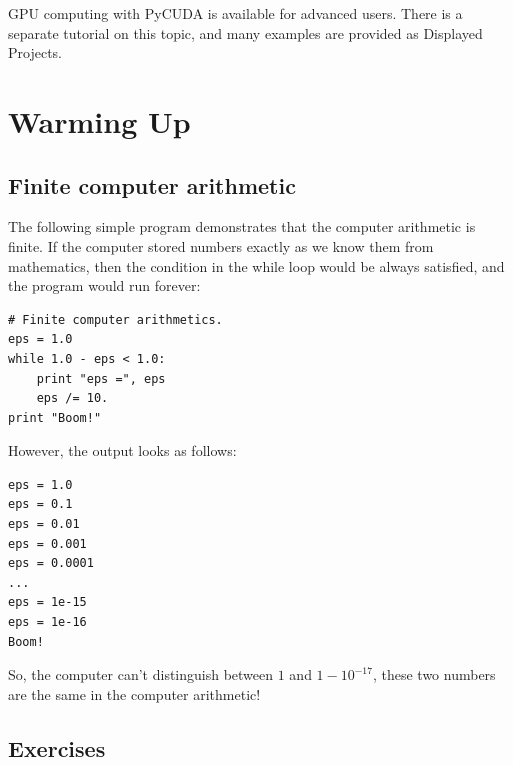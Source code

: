 \documentclass[article,A4,12pt]{llncs}
\begin{document}
GPU computing with PyCUDA is available for advanced users. There
is a separate tutorial on this topic, and many examples are provided
as Displayed Projects.


\newpage


\section{Warming Up}



\subsection{Finite computer arithmetic}

The following simple program demonstrates that the computer 
arithmetic is finite. If the computer stored numbers exactly 
as we know them from mathematics, then the condition in the while 
loop would be always satisfied, and the program would run forever:

\begin{verbatim}
# Finite computer arithmetics.
eps = 1.0
while 1.0 - eps < 1.0:
    print "eps =", eps
    eps /= 10.
print "Boom!"
\end{verbatim}
However, the output looks as follows:

\begin{verbatim}
eps = 1.0
eps = 0.1
eps = 0.01
eps = 0.001
eps = 0.0001
...
eps = 1e-15
eps = 1e-16
Boom!
\end{verbatim}
\noindent
So, the computer can't distinguish between $1$ and $1 - 10^{-17}$, these two numbers 
are the same in the computer arithmetic!

\subsection{Exercises}
\end{document}
